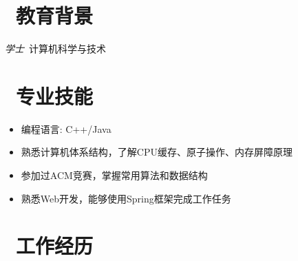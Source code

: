 \documentclass{resume}
\begin{document}



\section{\texorpdfstring{\faGraduationCap\ 教育背景}{教育背景}}
\textit{学士}\ 计算机科学与技术

\section{\texorpdfstring{\faCogs\ 专业技能}{专业技能}}
\begin{itemize}[parsep=0.5ex]
  \item 编程语言: C++/Java
  \item 熟悉计算机体系结构，了解CPU缓存、原子操作、内存屏障原理
  \item 参加过ACM竞赛，掌握常用算法和数据结构
  \item 熟悉Web开发，能够使用Spring框架完成工作任务
\end{itemize}

\section{\texorpdfstring{\faUsers\ 工作经历}{工作经历}}
\end{document}
